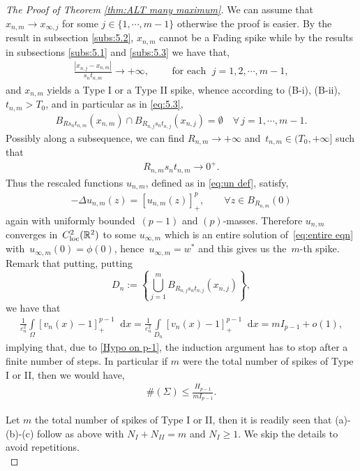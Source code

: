 \documentclass[10pt]{amsart}
\newcommand{\R}{\mathbb{R}}
\newcommand{\dd}{\mathop{}\!\mathrm{d}}
\newcommand{\eps}{\varepsilon}
\def\R{\mathbb{R}}
\renewcommand{\to}{\rightarrow}
\newcommand{\ii}{\infty}
\newcommand{\om}{\Omega}
\begin{document}
\begin{proof}[The Proof of Theorem \ref{thm:ALT many maximum}]
   We can assume that $x_{n,m}\to x_{\ii,j}$ for some $j\in \{1,\cdots,m-1\}$ otherwise the proof is easier.
   By the result in subsection \ref{subs:5.2}, $x_{n,m}$ cannot be a Fading spike while by the results in subsections \ref{subs:5.1} and \ref{subs:5.3}
   we have that,
    \begin{align*}
        \frac{|x_{n,j}-x_{n,m}|}{s_n t_{n,m}} \to +\infty, \qquad \mbox{ for each }\; j=1,2,\cdots, m-1,
    \end{align*}
   and $x_{n,m}$ yields a Type I or a Type II spike, whence according to (B-i), (B-ii), $t_{n,m}>T_0$, and in particular as in \eqref{eq:5.3},
  \begin{align*}
        B_{R s_n t_{n,m}} (x_{n,m}) \cap B_{R_{n,j} s_n t_{n,j}} (x_{n,j})=\emptyset\quad \forall\,j=1,\cdots, m-1.
    \end{align*}
Possibly along a subsequence, we can find $R_{n,m}\to+\infty$ and~$t_{n,m}\in (T_0,+\infty]$ such that
    \begin{align*}
        R_{n,m} s_n t_{n,m}\to 0^+.
    \end{align*}
     Thus the rescaled functions $u_{n,m}$, defined as in \ref{eq:un def}, satisfy,
    \begin{align*}
        -\Delta u_{n,m}(z) = [u_{n,m}(z)]_+^p, \qquad \forall z\in B_{R_{n,m}}(0)
    \end{align*}
    again with uniformly bounded~$(p-1)$ and $(p)$-masses. Therefore $u_{n,m}$ converges in~$C^2_{\rm loc}(\R^2)$ to some
    $u_{\infty,m}$ which is an entire solution of~\eqref{eq:entire eqn} with~$u_{\infty,m}(0)=\phi(0)$, hence~$u_{\infty,m}=w^*$
    and this gives us the~$m$-th spike. Remark that putting,
    putting
    $$
     D_n:=\left\{\bigcup_{j=1}^{m} B_{R_{n,j}s_n t_{n,j}}(x_{n,j})\right\},
     $$
    we have that
\begin{align*}
              \frac{1}{\eps_n^2}\int\limits_{\om} [v_n(x)-1]_+^{p-1}\dd{x}=\frac{1}{\eps_n^2}\int\limits_{D_n} [v_n(x)-1]_+^{p-1}\dd{x}=
              mI_{p-1} + o(1),
            \end{align*}
            implying that, due to \eqref{Hypo on p-1}, the induction argument has to stop after a finite number of steps.
            In particular if $m$ were the total number of spikes of Type I or II, then we would have,
              \begin{align*}
            \#(\Sigma) \leq \frac{ H_{p-1}}{m I_{p-1}}.
        \end{align*}

Let $m$ the total number of spikes of Type I or II, then it is readily seen that (a)-(b)-(c) follow as above with $N_{I}+N_{II}=m$ and $N_I\geq 1$.
We skip the details to avoid repetitions.\\


\end{proof}
\end{document}
